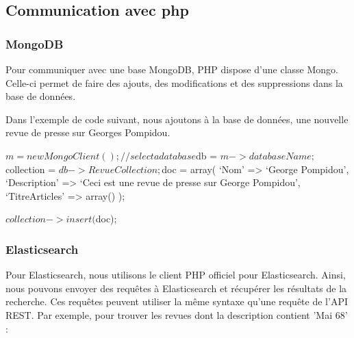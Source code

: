 \subsection{Communication avec php}
\subsubsection{MongoDB}

Pour communiquer avec une base MongoDB, PHP dispose d’une classe Mongo. Celle-ci permet de faire des ajouts, des modifications et des suppressions dans la base de données. 

Dans l'exemple de code suivant, nous ajoutons à la base de données, une nouvelle revue de presse sur Georges Pompidou.

\begin{verbatimtab}[3]
$m = new MongoClient();

// select a database
$db = $m->databaseName;   
$collection = $db->RevueCollection;

$doc = array(
	‘Nom’ => ‘George Pompidou’,
	‘Description’ => ‘Ceci est une revue de presse sur George Pompidou’,
	‘TitreArticles’ => array()
);

$collection->insert($doc);
\end{verbatimtab}


\subsubsection{Elasticsearch}

Pour Elasticsearch, nous utilisons le client PHP officiel pour Elasticsearch. Ainsi, nous pouvons envoyer des requêtes à Elasticsearch et récupérer les résultats de la recherche. Ces requêtes peuvent utiliser la même syntaxe qu’une requête de l’API REST. Par exemple, pour trouver les revues dont la description contient 'Mai 68' :



